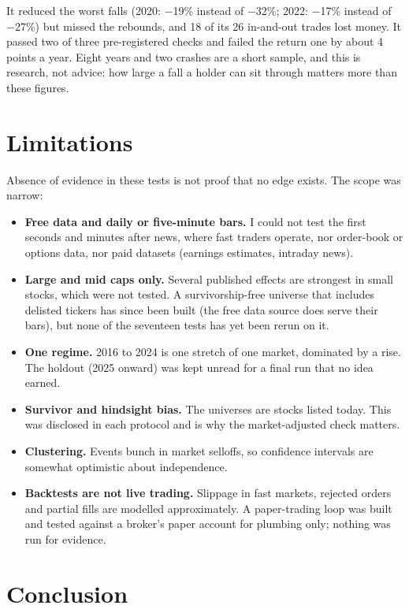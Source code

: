 \documentclass[11pt,a4paper]{article}
\providecommand{\tightlist}{\setlength{\itemsep}{0pt}\setlength{\parskip}{0pt}}
\begin{document}
It reduced the worst falls (2020: −19\% instead of −32\%; 2022: −17\% instead of −27\%) but missed the rebounds, and 18
of its 26 in-and-out trades lost money. It passed two of three pre-registered checks and failed the return one by
about 4 points a year. Eight years and two crashes are a short sample, and this is research, not advice: how large a fall
a holder can sit through matters more than these figures.

\section{Limitations}\label{sec:limits}

Absence of evidence in these tests is not proof that no edge exists. The scope was narrow:

\begin{itemize}
\tightlist
\item
  \textbf{Free data and daily or five-minute bars.} I could not test the first seconds and minutes after news, where fast
  traders operate, nor order-book or options data, nor paid datasets (earnings estimates, intraday news).
\item
  \textbf{Large and mid caps only.} Several published effects are strongest in small stocks, which were not tested. A
  survivorship-free universe that includes delisted tickers has since been built (the free data source does serve their bars),
  but none of the seventeen tests has yet been rerun on it.
\item
  \textbf{One regime.} 2016 to 2024 is one stretch of one market, dominated by a rise. The holdout (2025 onward) was kept unread
  for a final run that no idea earned.
\item
  \textbf{Survivor and hindsight bias.} The universes are stocks listed today. This was disclosed in each protocol and is why the
  market-adjusted check matters.
\item
  \textbf{Clustering.} Events bunch in market selloffs, so confidence intervals are somewhat optimistic about independence.
\item
  \textbf{Backtests are not live trading.} Slippage in fast markets, rejected orders and partial fills are modelled
  approximately. A paper-trading loop was built and tested against a broker's paper account for plumbing only; nothing was
  run for evidence.
\end{itemize}

\section{Conclusion}\label{sec:conclusion}
\end{document}
